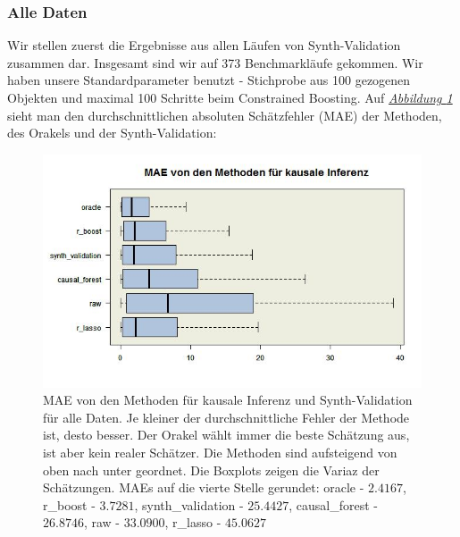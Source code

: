 \documentclass[12pt,a4paper,twoside]{scrartcl}
\numberwithin{equation}{section}
\newcommand{\reffig}[1]{\emph{\hyperref[#1]{Abbildung \ref*{#1}}}}
\begin{document}
\subsubsection{Alle Daten}\label{subsubsec:ergebnisseAlleDaten} 
Wir stellen zuerst die Ergebnisse aus allen Läufen von Synth-Validation zusammen dar. Insgesamt sind wir auf 373 Benchmarkläufe gekommen. Wir haben unsere Standardparameter benutzt - Stichprobe aus 100 gezogenen Objekten und maximal 100 Schritte beim Constrained Boosting. Auf \reffig{fig:allRunsBoxplot} sieht man den durchschnittlichen absoluten Schätzfehler (MAE) der Methoden, des Orakels und der Synth-Validation:\par

\begin{center}
\begin{figure}[h]
    \centering
    \includegraphics[height=0.5\textwidth, width=1\textwidth]{figures/plots/allRunsBoxplot.jpeg}
    \caption[MAE von den Methoden für kausale Inferenz und Synth-Validation für alle Daten]{MAE von den Methoden für kausale Inferenz und Synth-Validation für alle Daten. Je kleiner der durchschnittliche Fehler der Methode ist, desto besser. Der Orakel wählt immer die beste Schätzung aus, ist aber kein realer Schätzer. Die Methoden sind aufsteigend von oben nach unter geordnet. Die Boxplots zeigen die Variaz der Schätzungen. MAEs auf die vierte Stelle gerundet: oracle - $2.4167$, r\_boost - $3.7281$, synth\_validation - $25.4427$, causal\_forest - $26.8746$, raw - $33.0900$, r\_lasso - $45.0627$}\label{fig:allRunsBoxplot}
  \end{figure}
\end{center}
\end{document}
